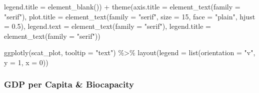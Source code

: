 \documentclass[
]{article}
\newenvironment{Shaded}{\begin{snugshade}}{\end{snugshade}}
\newcommand{\AttributeTok}[1]{\textcolor[rgb]{0.77,0.63,0.00}{#1}}
\newcommand{\DecValTok}[1]{\textcolor[rgb]{0.00,0.00,0.81}{#1}}
\newcommand{\FloatTok}[1]{\textcolor[rgb]{0.00,0.00,0.81}{#1}}
\newcommand{\FunctionTok}[1]{\textcolor[rgb]{0.00,0.00,0.00}{#1}}
\newcommand{\NormalTok}[1]{#1}
\newcommand{\SpecialCharTok}[1]{\textcolor[rgb]{0.00,0.00,0.00}{#1}}
\newcommand{\StringTok}[1]{\textcolor[rgb]{0.31,0.60,0.02}{#1}}
\begin{document}
\begin{Shaded}
\begin{Highlighting}[]
        \AttributeTok{legend.title =} \FunctionTok{element\_blank}\NormalTok{()) }\SpecialCharTok{+} \FunctionTok{theme}\NormalTok{(}\AttributeTok{axis.title =} \FunctionTok{element\_text}\NormalTok{(}\AttributeTok{family =} \StringTok{"serif"}\NormalTok{),}
    \AttributeTok{plot.title =} \FunctionTok{element\_text}\NormalTok{(}\AttributeTok{family =} \StringTok{"serif"}\NormalTok{,}
        \AttributeTok{size =} \DecValTok{15}\NormalTok{, }\AttributeTok{face =} \StringTok{"plain"}\NormalTok{, }\AttributeTok{hjust =} \FloatTok{0.5}\NormalTok{),}
    \AttributeTok{legend.text =} \FunctionTok{element\_text}\NormalTok{(}\AttributeTok{family =} \StringTok{"serif"}\NormalTok{),}
    \AttributeTok{legend.title =} \FunctionTok{element\_text}\NormalTok{(}\AttributeTok{family =} \StringTok{"serif"}\NormalTok{))}

\FunctionTok{ggplotly}\NormalTok{(scat\_plot, }\AttributeTok{tooltip =} \StringTok{"text"}\NormalTok{) }\SpecialCharTok{\%\textgreater{}\%}
  \FunctionTok{layout}\NormalTok{(}\AttributeTok{legend =} \FunctionTok{list}\NormalTok{(}\AttributeTok{orientation =} \StringTok{"v"}\NormalTok{, }\AttributeTok{y =} \DecValTok{1}\NormalTok{,}
                       \AttributeTok{x =} \DecValTok{0}\NormalTok{))}
\end{Highlighting}
\end{Shaded}

\hypertarget{gdp-per-capita-biocapacity}{%
\subsubsection{GDP per Capita \&
Biocapacity}\label{gdp-per-capita-biocapacity}}
\end{document}
